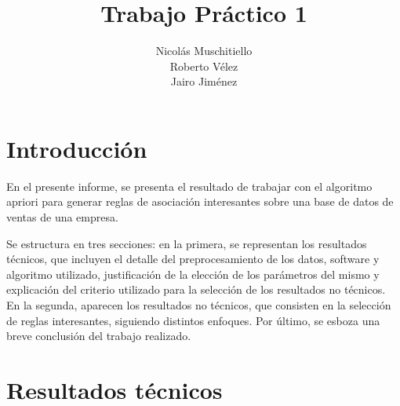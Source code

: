 \documentclass[]{article}
\title{Trabajo Práctico 1}
\author{Nicolás Muschitiello \\
	Roberto Vélez\\
	Jairo Jiménez
}
\begin{document}
	
	\maketitle
	
	\section{Introducción}
	
	En el presente informe, se presenta el resultado de trabajar con el algoritmo apriori \cite{Agrawal:1994:FAM:645920.672836} para generar reglas de asociación interesantes sobre una base de datos de ventas de una empresa.
	
	Se estructura en tres secciones: en la primera, se representan los resultados técnicos, que incluyen el detalle del preprocesamiento de los datos, software y algoritmo utilizado, justificación de la elección de los parámetros del mismo y explicación del criterio utilizado para la selección de los resultados no técnicos. En la segunda, aparecen los resultados no técnicos, que consisten en la selección de reglas interesantes, siguiendo distintos enfoques. Por último, se esboza una breve conclusión del trabajo realizado.
	
	
	\section{Resultados técnicos}
\end{document}
